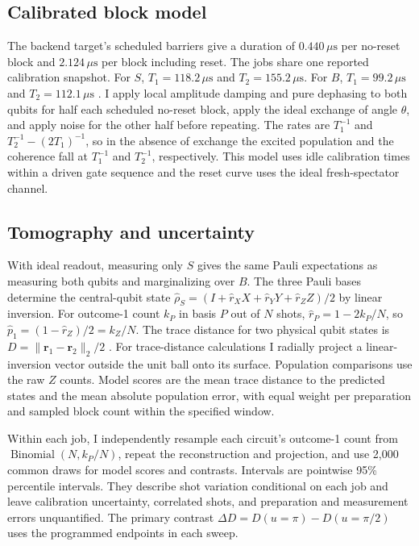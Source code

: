 \documentclass[
    pra,
    showpacs,
    groupedaddress,
    notitlepage,
    floatfix,
    nofootinbib
]{revtex4-2}
\begin{document}
\subsection{Calibrated block model}
\label{sec:calibrated-model}
The backend target's scheduled barriers give a duration of $0.440\,\mu\mathrm{s}$ per no-reset block and $2.124\,\mu\mathrm{s}$ per block including reset. 
The jobs share one reported calibration snapshot. For $S$, $T_1=118.2\,\mu\mathrm{s}$ and $T_2=155.2\,\mu\mathrm{s}$. For 
$B$, $T_1=99.2\,\mu\mathrm{s}$ and $T_2=112.1\,\mu\mathrm{s}$ \cite{ibmbackend}. I apply local amplitude damping and pure dephasing to both 
qubits for half each scheduled no-reset block, apply the ideal exchange of angle $\theta$, and apply noise for the other half before repeating. 
The rates are $T_1^{-1}$ and $T_2^{-1}-(2T_1)^{-1}$, so in the absence of exchange the excited population and the coherence fall at $T_1^{-1}$ and 
$T_2^{-1}$, respectively. This model uses idle calibration times within a driven gate sequence and the reset curve uses 
the ideal fresh-spectator channel.


\subsection{Tomography and uncertainty}
With ideal readout, measuring only $S$ gives the same Pauli expectations as measuring both qubits and marginalizing over $B$. The three Pauli bases determine the
central-qubit state $\hat\rho_S=(I+\hat r_X X+\hat r_Y Y+\hat r_Z Z)/2$ by linear inversion. For outcome-1 count $k_P$ in basis $P$ out of
$N$ shots, $\hat r_P=1-2k_P/N$, so $\hat p_1=(1-\hat r_Z)/2=k_Z/N$. The trace
distance for two physical qubit states is $D=\|\boldsymbol r_1-\boldsymbol r_2\|_2/2$ \cite{nielsen}. For trace-distance calculations I radially 
project a linear-inversion vector outside the unit ball onto its surface. Population comparisons use the raw $Z$ counts. Model scores are the 
mean trace distance to the predicted states and the mean absolute population error, with equal weight per preparation and sampled block count 
within the specified window.

Within each job, I independently resample each circuit's outcome-1 count from $\operatorname{Binomial}(N,k_P/N)$, repeat the reconstruction and 
projection, and use 2,000 common draws for model scores and contrasts. Intervals are pointwise 95\% percentile intervals. They describe shot 
variation conditional on each job and leave calibration uncertainty, correlated shots, and preparation and measurement errors unquantified. 
The primary contrast $\Delta D=D(u=\pi)-D(u=\pi/2)$ uses the programmed endpoints in each sweep.
\end{document}
